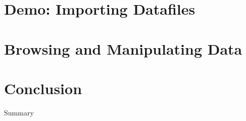 \documentclass[10pt, compress]{beamer}
\begin{document}
\section{Demo: Importing Datafiles}

\section{Browsing and Manipulating Data}

\section{Conclusion}

\begin{frame}{Summary}


\end{frame}

\end{document}
